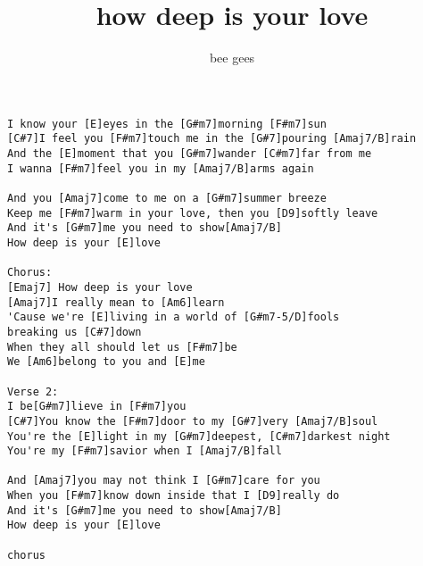 \author{bee gees}
\title{how deep is your love}
\maketitle
\begin{verbatim}
I know your [E]eyes in the [G#m7]morning [F#m7]sun
[C#7]I feel you [F#m7]touch me in the [G#7]pouring [Amaj7/B]rain
And the [E]moment that you [G#m7]wander [C#m7]far from me
I wanna [F#m7]feel you in my [Amaj7/B]arms again

And you [Amaj7]come to me on a [G#m7]summer breeze
Keep me [F#m7]warm in your love, then you [D9]softly leave
And it's [G#m7]me you need to show[Amaj7/B]
How deep is your [E]love

Chorus:
[Emaj7] How deep is your love
[Amaj7]I really mean to [Am6]learn
'Cause we're [E]living in a world of [G#m7-5/D]fools
breaking us [C#7]down
When they all should let us [F#m7]be
We [Am6]belong to you and [E]me

Verse 2:
I be[G#m7]lieve in [F#m7]you
[C#7]You know the [F#m7]door to my [G#7]very [Amaj7/B]soul
You're the [E]light in my [G#m7]deepest, [C#m7]darkest night
You're my [F#m7]savior when I [Amaj7/B]fall

And [Amaj7]you may not think I [G#m7]care for you
When you [F#m7]know down inside that I [D9]really do
And it's [G#m7]me you need to show[Amaj7/B]
How deep is your [E]love

chorus
\end{verbatim}